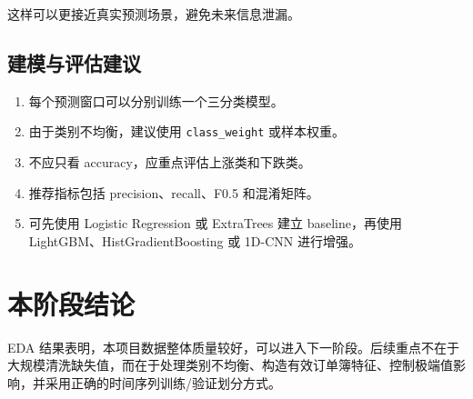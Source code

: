 \documentclass[UTF8,a4paper,12pt]{ctexart}
\begin{document}
这样可以更接近真实预测场景，避免未来信息泄漏。

\subsection{建模与评估建议}

\begin{enumerate}
    \item 每个预测窗口可以分别训练一个三分类模型。
    \item 由于类别不均衡，建议使用 \texttt{class\_weight} 或样本权重。
    \item 不应只看 accuracy，应重点评估上涨类和下跌类。
    \item 推荐指标包括 precision、recall、F0.5 和混淆矩阵。
    \item 可先使用 Logistic Regression 或 ExtraTrees 建立 baseline，再使用 LightGBM、HistGradientBoosting 或 1D-CNN 进行增强。
\end{enumerate}

\section{本阶段结论}

EDA 结果表明，本项目数据整体质量较好，可以进入下一阶段。后续重点不在于大规模清洗缺失值，而在于处理类别不均衡、构造有效订单簿特征、控制极端值影响，并采用正确的时间序列训练/验证划分方式。
\end{document}
